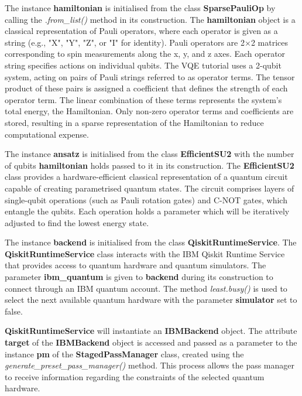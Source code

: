 \documentclass{article}
\begin{document}
{The instance \textbf{hamiltonian} is initialised from the class \textbf{SparsePauliOp} by calling the \textit{.from\_list()} method in its construction. The \textbf{hamiltonian} object is a classical representation of Pauli operators, where each operator is given as a string (e.g., "X", "Y", "Z", or "I" for identity). Pauli operators are 2×2 matrices corresponding to spin measurements along the x, y, and z axes\cite{DJORDJEVIC201229}. Each operator string specifies actions on individual qubits. The VQE tutorial uses a 2-qubit system, acting on pairs of Pauli strings referred to as operator terms. The tensor product of these pairs is assigned a coefficient that defines the strength of each operator term. The linear combination of these terms represents the system's total energy, the Hamiltonian. Only non-zero operator terms and coefficients are stored, resulting in a sparse representation of the Hamiltonian to reduce computational expense\cite{EITCA2024}\cite{SparsePauliOp}\cite{PauliList}.

The instance \textbf{ansatz} is initialised from the class \textbf{EfficientSU2} with the number of qubits \textbf{hamiltonian} holds passed to it in its construction. The \textbf{EfficientSU2} class provides a hardware-efficient classical representation of a quantum circuit capable of creating parametrised quantum states\cite{ansatz}. The circuit comprises layers of single-qubit operations (such as Pauli rotation gates) and C-NOT gates, which entangle the qubits\cite{EfficientSU2}. Each operation holds a parameter which will be iteratively adjusted to find the lowest energy state.

The instance \textbf{backend} is initialised from the class \textbf{QiskitRuntimeService}. The \textbf{QiskitRuntimeService} class interacts with the IBM Qiskit Runtime Service that provides access to quantum hardware and quantum simulators. The parameter \textbf{ibm\_quantum} is given to \textbf{backend} during its construction to connect through an IBM quantum account\cite{qrsreadme}. The method \textit{least.busy()} is used to select the next available quantum hardware with the parameter \textbf{simulator} set to false.

\textbf{QiskitRuntimeService} will instantiate an \textbf{IBMBackend} object. The attribute \textbf{target} of the \textbf{IBMBackend} object is accessed and passed as a parameter to the instance \textbf{pm} of the \textbf{StagedPassManager} class, created using the \textit{generate\_preset\_pass\_manager()} method. This process allows the pass manager to receive information regarding the constraints of the selected quantum hardware.

}
\end{document}

